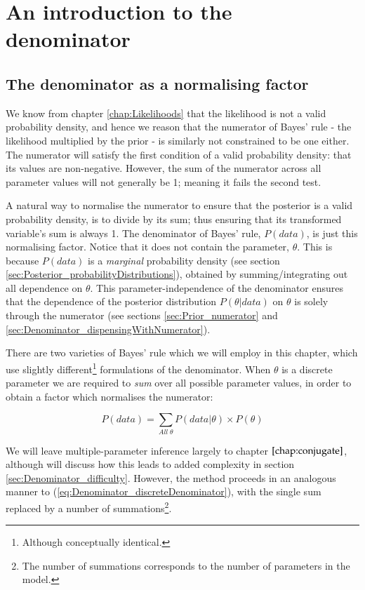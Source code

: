 \documentclass[11pt,fullpage]{book}
\begin{document}
\section{An introduction to the denominator}
\subsection{The denominator as a normalising factor}
We know from chapter \ref{chap:Likelihoods} that the likelihood is not a valid probability density, and hence we reason that the numerator of Bayes' rule - the likelihood multiplied by the prior - is similarly not constrained to be one either. The numerator will satisfy the first condition of a valid probability density: that its values are non-negative. However, the sum of the numerator across all parameter values will not generally be 1; meaning it fails the second test.

A natural way to normalise the numerator to ensure that the posterior is a valid probability density, is to divide by its sum; thus ensuring that its transformed variable's sum is always 1. The denominator of Bayes' rule, $P(data)$, is just this normalising factor. Notice that it does not contain the parameter, $\theta$. This is because $P(data)$ is a \textit{marginal} probability density (see section \ref{sec:Posterior_probabilityDistributions}), obtained by summing/integrating out all dependence on $\theta$. This parameter-independence of the denominator ensures that the dependence of the posterior distribution $P(\theta|data)$ on $\theta$ is solely through the numerator (see sections \ref{sec:Prior_numerator} and \ref{sec:Denominator_dispensingWithNumerator}). 

There are two varieties of Bayes' rule which we will employ in this chapter, which use slightly different\footnote{Although conceptually identical.} formulations of the denominator. When $\theta$ is a discrete parameter we are required to \textit{sum} over all possible parameter values, in order to obtain a factor which normalises the numerator:

\begin{equation}\label{eq:Denominator_discreteDenominator}
P(data) = \sum\limits_{All\;\theta} P(data|\theta) \times P(\theta)
\end{equation}

We will leave multiple-parameter inference largely to chapter $\ref{chap:conjugate}$, although will discuss how this leads to added complexity in section \ref{sec:Denominator_difficulty}. However, the method proceeds in an analogous manner to (\ref{eq:Denominator_discreteDenominator}), with the single sum replaced by a number of summations\footnote{The number of summations corresponds to the number of parameters in the model.}.
\end{document}
